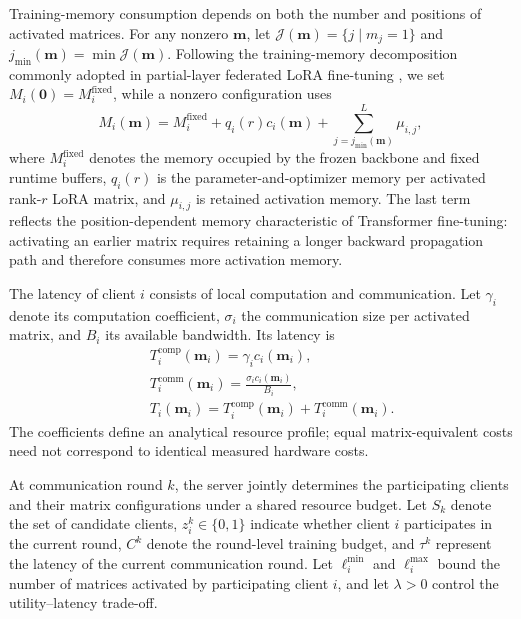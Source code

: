 \documentclass[10pt,conference,letterpaper]{IEEEtran}
\begin{document}
Training-memory consumption depends on both the number and positions of activated matrices. For any nonzero \(\mathbf m\), let
\(\mathcal{J}(\mathbf m)=\{j\mid m_j=1\}\) and \(j_{\min}(\mathbf m)=\min\mathcal{J}(\mathbf m)\).
Following the training-memory decomposition commonly adopted in partial-layer federated LoRA fine-tuning \cite{zhang2025fedhello}, we set \(M_i(\mathbf0)=M_i^{\mathrm{fixed}}\), while a nonzero configuration uses
\begin{equation}
M_i(\mathbf m)=M_i^{\mathrm{fixed}}+q_i(r)c_i(\mathbf m)+\sum_{j=j_{\min}(\mathbf m)}^{L}\mu_{i,j},
\label{eq:memory}
\end{equation}
where
$M_i^{\mathrm{fixed}}$
denotes the memory occupied by the frozen backbone and fixed runtime buffers,
$q_i(r)$ is the parameter-and-optimizer memory per activated rank-\(r\) LoRA matrix, and
$\mu_{i,j}$ is retained activation memory. The last term reflects the position-dependent memory characteristic of Transformer
fine-tuning: activating an earlier matrix requires retaining a longer backward propagation path and therefore consumes more activation memory. 

The latency of client $i$ consists of local computation and communication. Let $\gamma_i$ denote its computation coefficient, $\sigma_i$ the communication size per activated matrix, and $B_i$ its available bandwidth. Its latency is
\begin{equation}
\begin{aligned}
&&T_i^{\mathrm{comp}}(\mathbf m_i)=\gamma_i c_i(\mathbf m_i),\\
&&T_i^{\mathrm{comm}}(\mathbf m_i)=\frac{\sigma_i c_i(\mathbf m_i)}{B_i},\\
&&T_i(\mathbf m_i)=T_i^{\mathrm{comp}}(\mathbf m_i)+T_i^{\mathrm{comm}}(\mathbf m_i).
\end{aligned}
\label{eq:latency-model}
\end{equation}
The coefficients define an analytical resource profile; equal matrix-equivalent costs need not correspond to identical measured hardware costs.


At communication round $k$, the server jointly determines the participating clients and their matrix configurations under a shared resource budget. Let $S_k$ denote the set of candidate clients,
$z_i^k\in\{0,1\}$ indicate whether client $i$ participates in the current round,
$C^k$ denote the round-level training budget, and $\tau^k$ represent the latency of the current communication round. Let \(\ell_i^{\min}\) and \(\ell_i^{\max}\) bound the number of matrices activated by participating client \(i\), and let \(\lambda>0\) control the utility--latency trade-off.
\end{document}
